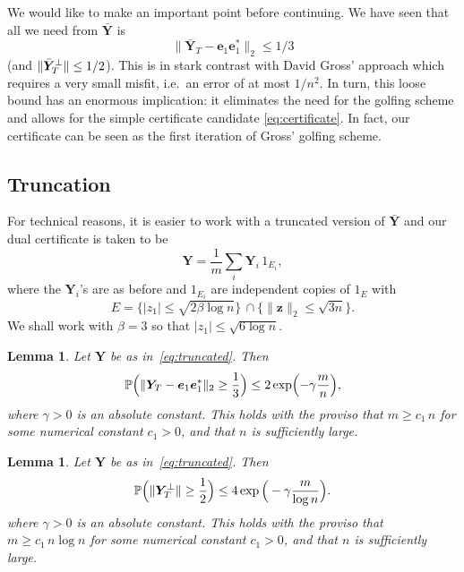 \documentclass[11pt]{article}
\newtheorem{lemma}[theorem]{Lemma}
\newcommand{\<}{\langle}
\renewcommand{\>}{\rangle}
\renewcommand{\P}{\operatorname{\mathbb{P}}}
\newcommand{\bY}{\bm{Y}}
\newcommand{\be}{\bm{e}}
\newcommand{\bz}{\bm{z}}
\numberwithin{equation}{section}
\begin{document}
We would like to make an important point before continuing. We have
seen that all we need from $\bar{\bY}$ is
\[
\|\bar{\bY}_T - \be_1 \be_1^*\|_2 \le 1/3
\] 
(and $\|\bar{\bY}_\Tp\|\le 1/2$).  This is in stark contrast with David Gross'
approach \cite{Gross09} which requires a very small misfit, i.e.~an
error of at most $1/n^2$. In turn, this loose bound has an enormous
implication: it eliminates the need for the golfing scheme and allows
for the simple certificate candidate \eqref{eq:certificate}.  In fact,
our certificate can be seen as the first iteration of Gross' golfing
scheme.

\subsection{Truncation}

For technical reasons, it is easier to work with a truncated version
of $\bar{\bY}$ and our dual certificate is taken to be
\begin{equation}
\label{eq:truncated}
{\bY} = \frac{1}{m} \sum_i \bY_i \, 1_{E_i}, 
\end{equation}
where the $\bY_i$'s are as before and $1_{E_i}$ are independent copies
of $1_E$ with 
\[
E = \{|z_1| \le \sqrt{2\beta \log n}\} \, \cap \{\|\bz\|_2 \le
\sqrt{3n}\}.
\]
We shall work with $\beta = 3$ so that $|z_1| \le \sqrt{6 \log n}$.


\begin{lemma}
\label{lem:YT}
Let ${\bY}$ be as in~\eqref{eq:truncated}. Then
\begin{equation}
\label{YTbound}
\P \Bigl( \| {\bY}_T - \be_1 \be_1^*\|_2 
\ge \frac{1}{3} \Bigr) \le 2\exp \Bigl(-\gamma \frac{m}{n}\Bigr),  
\end{equation}
where $\gamma >0$ is an absolute constant. This holds with the proviso
that $m \ge c_1 \, n$ for some numerical constant $c_1 > 0$, and that
$n$ is sufficiently large.
\end{lemma}



\begin{lemma}
\label{lem:YTp}
Let ${\bY}$ be as in~\eqref{eq:truncated}. Then
\begin{equation}
\label{YTpbound}
\P \Bigl( \| {\bY}_\Tp \| \ge \frac{1}{2} \Bigr) \le 
4 \exp \Big(-\gamma \frac{m}{\log n}\Big). 
\end{equation}
where $\gamma > 0$ is an absolute constant. This holds with the
proviso that $m \ge c_1 \, n \log n$ for some numerical constant $c_1
> 0$, and that $n$ is sufficiently large.
\end{lemma}
\end{document}
